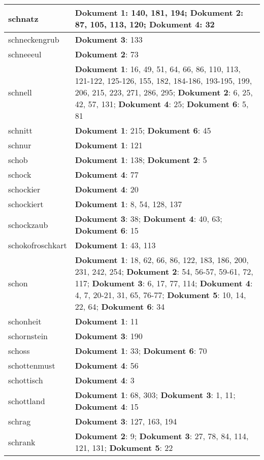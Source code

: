 \documentclass[a5paper]{article}
\begin{document}
\begin{longtable}[l]{|l|p{3in}|}
\hline
schnatz & \textbf{Dokument 1}: 140, 181, 194; \textbf{Dokument 2}: 87, 105, 113, 120; \textbf{Dokument 4}: 32 \\
\hline
schneckengrub & \textbf{Dokument 3}: 133 \\
\hline
schneeeul & \textbf{Dokument 2}: 73 \\
\hline
schnell & \textbf{Dokument 1}: 16, 49, 51, 64, 66, 86, 110, 113, 121-122, 125-126, 155, 182, 184-186, 193-195, 199, 206, 215, 223, 271, 286, 295; \textbf{Dokument 2}: 6, 25, 42, 57, 131; \textbf{Dokument 4}: 25; \textbf{Dokument 6}: 5, 81 \\
\hline
schnitt & \textbf{Dokument 1}: 215; \textbf{Dokument 6}: 45 \\
\hline
schnur & \textbf{Dokument 1}: 121 \\
\hline
schob & \textbf{Dokument 1}: 138; \textbf{Dokument 2}: 5 \\
\hline
schock & \textbf{Dokument 4}: 77 \\
\hline
schockier & \textbf{Dokument 4}: 20 \\
\hline
schockiert & \textbf{Dokument 1}: 8, 54, 128, 137 \\
\hline
schockzaub & \textbf{Dokument 3}: 38; \textbf{Dokument 4}: 40, 63; \textbf{Dokument 6}: 15 \\
\hline
schokofroschkart & \textbf{Dokument 1}: 43, 113 \\
\hline
schon & \textbf{Dokument 1}: 18, 62, 66, 86, 122, 183, 186, 200, 231, 242, 254; \textbf{Dokument 2}: 54, 56-57, 59-61, 72, 117; \textbf{Dokument 3}: 6, 17, 77, 114; \textbf{Dokument 4}: 4, 7, 20-21, 31, 65, 76-77; \textbf{Dokument 5}: 10, 14, 22, 64; \textbf{Dokument 6}: 34 \\
\hline
schonheit & \textbf{Dokument 1}: 11 \\
\hline
schornstein & \textbf{Dokument 3}: 190 \\
\hline
schoss & \textbf{Dokument 1}: 33; \textbf{Dokument 6}: 70 \\
\hline
schottenmust & \textbf{Dokument 4}: 56 \\
\hline
schottisch & \textbf{Dokument 4}: 3 \\
\hline
schottland & \textbf{Dokument 1}: 68, 303; \textbf{Dokument 3}: 1, 11; \textbf{Dokument 4}: 15 \\
\hline
schrag & \textbf{Dokument 3}: 127, 163, 194 \\
\hline
schrank & \textbf{Dokument 2}: 9; \textbf{Dokument 3}: 27, 78, 84, 114, 121, 131; \textbf{Dokument 5}: 22 \\

\end{longtable}
\end{document}
